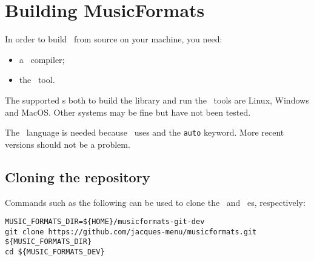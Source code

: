 



\chapter{Building MusicFormats}

In order to build \mf\ from source on your machine, you need:
\begin{itemize}
\item a \CPlusplus\ compiler;
\item the \cmake\ tool.
\end{itemize}

The supported \OS s both to build the library and run the \CLI\ tools are Linux, Windows and MacOS. Other systems may be fine but have not been tested.

The \CPlusplus\ language is needed because \mf\ uses  and the {\tt auto} keyword. More recent versions should not be a problem.


\section{Cloning the repository}

Commands such as the following can be used to clone the \master\ and \version\ \branch es, respectively:

\begin{lstlisting}[language=Terminal]
MUSIC_FORMATS_DIR=${HOME}/musicformats-git-dev
git clone https://github.com/jacques-menu/musicformats.git ${MUSIC_FORMATS_DIR}
cd ${MUSIC_FORMATS_DEV}
\end{lstlisting}

